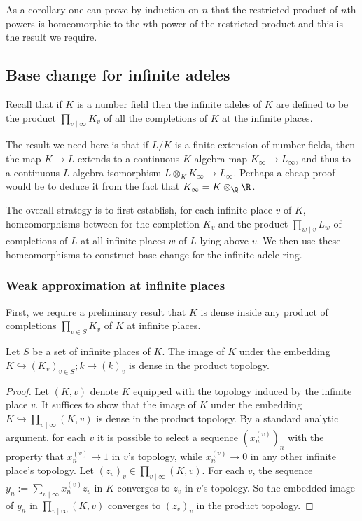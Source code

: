 As a corollary one can prove by induction on $n$ that the restricted product of $n$th powers
is homeomorphic to the $n$th power of the restricted product and this is the result
we require.

\subsection{Base change for infinite adeles}

Recall that if $K$ is a number field then the infinite adeles of $K$ are defined
to be the product $\prod_{v\mid\infty} K_v$ of all the completions of $K$ at the
infinite places.

The result we need here is that if $L/K$ is a finite extension of number fields,
then the map $K\to L$ extends to a continuous $K$-algebra map $K_\infty\to L_\infty$,
and thus to a continuous $L$-algebra isomorphism $L\otimes_KK_\infty\to L_\infty$.
Perhaps a cheap proof would be to deduce it from the fact that $K_\infty=K\otimes_{\Q}\R$.

The overall strategy is to first establish, for each infinite place $v$ of $K$, homeomorphisms
between for the completion $K_v$ and the product $\prod_{w\mid v}L_w$ of completions of $L$ at
all infinite places $w$ of $L$ lying above $v$.
We then use these homeomorphisms to construct base change for the infinite adele ring.

\subsubsection{Weak approximation at infinite places}

First, we require a preliminary result that $K$ is dense inside any product of
completions $\prod_{v\in S} K_v$ of $K$ at infinite places.

\begin{theorem}
  \label{NumberField.InfinitePlace.Completion.denseRange_algebraMap_subtype_pi}
  \leanok
  Let $S$ be a set of infinite places of $K$. The image of $K$ under the embedding
  $K\hookrightarrow (K_v)_{v\in S}; k \mapsto (k)_v$ is dense in the product topology.
\end{theorem}
\begin{proof}
  Let $(K, v)$ denote $K$ equipped with the topology induced by the infinite place $v$.
  It suffices to show that the image of $K$ under the embedding
  $K\hookrightarrow \prod_{v\mid \infty}(K, v)$ is dense in the product topology.
  By a standard analytic argument, for each $v$ it is possible to select a sequence $(x_n^{(v)})_n$
  with the property that $x_n^{(v)} \to 1$ in $v$'s topology, while $x_n^{(v)} \to 0$ in any other
  infinite place's topology.
  Let $(z_v)_v \in \prod_{v\mid \infty}(K, v)$.
  For each $v$, the sequence $y_n := \sum_{v\mid\infty} x_n^{(v)}z_v$ in $K$ converges to
  $z_v$ in $v$'s topology.
  So the embedded image of $y_n$ in $\prod_{v\mid \infty}(K, v)$ converges to $(z_v)_v$ in the
  product topology.
\end{proof}

